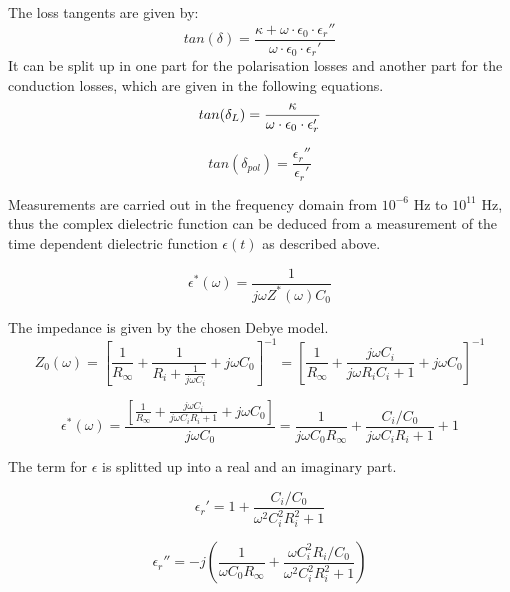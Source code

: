 The loss tangents are given by:
\begin{equation}
tan (\delta) = \frac{\kappa + \omega \cdot \epsilon_0 \cdot \epsilon _r ''}{\omega \cdot \epsilon_0 \cdot \epsilon _r '}
\end{equation}
It can be split up in one part for the polarisation losses and another part for the conduction losses, which are given in the following equations. 
\begin{equation}
tan (\delta_{L}) = \frac{\kappa}{\omega \cdot \epsilon_0 \cdot \epsilon_r'} \newline
\end{equation}

\begin{equation}
tan (\delta_{pol}) = \frac {\epsilon_r'' } {\epsilon_r'}
\end{equation}


Measurements are carried out in the frequency domain from $10^{-6}$ Hz to $10^{11}$ Hz, thus the complex dielectric function can be deduced from a measurement of the time dependent dielectric function $\epsilon(t)$ as described above. 

\begin{equation}
\epsilon^*(\omega) = \frac{1}{j \omega  Z^*(\omega) C_0}
\end{equation}

The impedance is given by the chosen Debye model. 
\begin{equation}
Z_0(\omega)=[\frac{1}{R_\infty}+\frac{1}{R_i+\frac{1}{j \omega C_i}}+j \omega C_0]^{-1} = [\frac{1}{R_\infty}+\frac{j \omega C_i}{j\omega R_i  C_i+1}+j \omega C_0]^{-1}
\end{equation}

\begin{equation}
\epsilon^*(\omega)= \frac{[\frac{1}{R_\infty}+\frac{j \omega C_i}{j\omega C_i R_i  +1}+j \omega C_0]}{j \omega C_0} = \frac{1}{j \omega C_0 R_\infty}+ \frac{C_i/C_0}{j\omega C_i R_i  +1}+1
\end{equation}

The term for $\epsilon$ is splitted up into a real and an imaginary part. 

\begin{equation}
\epsilon_r' = 1+ \frac{C_i/C_0}{\omega^2 C_i^2 R_i^2 +1}
\end{equation}

\begin{equation}
\epsilon_r'' = -j \left(\frac{1}{\omega C_0 R_\infty}+\frac{\omega C_i^2 R_i / C_0}{\omega^2 C_i^2 R_i^2 +1} \right)
\end{equation}

